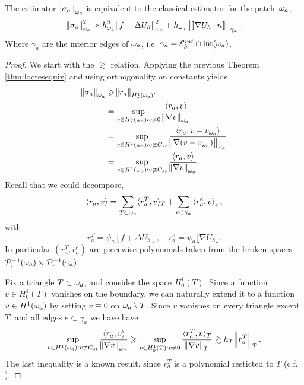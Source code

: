 \documentclass[thesis.tex]{subfiles}
\begin{document}
\begin{lem}
  \label{lem:starequiv}
  The estimator $\norm{\sigma_a}_{\omega_a}$ is equivalent to the classical estimator for the patch~$\omega_a$, 
  \[
    \norm{\sigma_a}^2_{\omega_a} \approx h_{\omega_a}^2\norm{f + \Delta U_h}^2_{\omega_a} + h_{\omega_a} \norm{\llbracket \nabla U_h \cdot n \rrbracket}_{\gamma_a}.
  \]
  Where $\gamma_a$ are the interior edges of $\omega_a$, i.e. $\gamma_a = \mathcal{E}_h^{int} \cap \text{int}(\omega_a)$.
\end{lem}
\begin{proof}
  We start with the $\gtrsim$ relation.  Applying the previous Theorem \ref{thm:locresequiv} and using orthogonality on constants yields  
  \begin{align*}
    \norm{\sigma_a}_{\omega_a} &\geqslant \norm{r_a}_{H^1_\star(\omega_a)'} \\
    &= \sup_{v \in H^1_\star(\omega_a) : v \ne 0} { \left \langle r_a, v \right \rangle \over \norm{\nabla v}_{\omega_a}} \\
    &= \sup_{v \in H^1(\omega_a) : v \not \equiv C_{st}} { \left \langle r_a, v - v_{\omega_a} \right \rangle \over \norm{\nabla (v - v_{\omega_a})}_{\omega_a}} \\
          &= \sup_{v \in H^1(\omega_a) : v \not \equiv C_{st}} { \left \langle r_a, v \right \rangle \over \norm{\nabla v}_{\omega_a}}.
  \end{align*}
  Recall  that we could decompose,
  \[
    \left \langle r_a,v \right \rangle = \sum_{T \subset \omega_a} \langle{r^T_a, v}\rangle_T + \sum_{e \subset \gamma_a} \left \langle r^e_a, v \right \rangle_e,
  \]
  with 
  \[
   r^T_a = \psi_a \left[ f + \Delta U_h \right], \quad r^e_a = \psi_a \llbracket \nabla U_h \rrbracket.
  \]
  In particular $(r^T_a, r^e_a)$ are piecewise polynomials taken from the broken spaces $\mathcal{P}_r^{-1}(\omega_a)\times \mathcal{P}_r^{-1}(\gamma_a)$.

  Fix a triangle $T \subset \omega_a$, and consider the space $H_0^1(T)$. Since a function $v \in H_0^1(T)$ vanishes on the boundary, 
  we can naturally extend it to a function $v \in H^1(\omega_a)$ by setting $v \equiv 0$ on $\omega_a \setminus T$. Since $v$
  vanishes on every triangle except $T$, and all edges $e \subset \gamma_a$ we have have
  \[
         \sup_{v \in H^1(\omega_a) : v \not \equiv C_{st}} { \left \langle r_a, v \right \rangle \over \norm{\nabla v}_{\omega_a}} 
         \geqslant \sup_{v \in H_0^1(T) : v \ne 0} { \langle{r^T_a, v}\rangle_T \over \norm{\nabla v}_{T}}
         \gtrsim h_T \norm{r^T_a}_T.
  \]
  The last inequality is a known result, since $r^T_a$ is a polynomial resticted to $T$ (c.f. \cite[Ex~9.x.5]{brenner}).
  

\end{proof}
\end{document}
